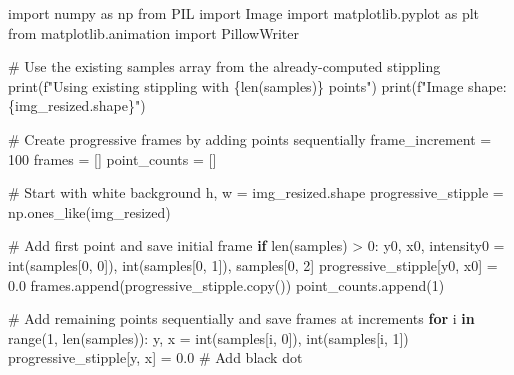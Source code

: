 \documentclass[
  letterpaper,
  DIV=11,
  numbers=noendperiod]{scrartcl}
\newenvironment{Shaded}{\begin{snugshade}}{\end{snugshade}}
\newcommand{\BuiltInTok}[1]{\textcolor[rgb]{0.00,0.23,0.31}{#1}}
\newcommand{\CommentTok}[1]{\textcolor[rgb]{0.37,0.37,0.37}{#1}}
\newcommand{\ControlFlowTok}[1]{\textcolor[rgb]{0.00,0.23,0.31}{\textbf{#1}}}
\newcommand{\DecValTok}[1]{\textcolor[rgb]{0.68,0.00,0.00}{#1}}
\newcommand{\FloatTok}[1]{\textcolor[rgb]{0.68,0.00,0.00}{#1}}
\newcommand{\ImportTok}[1]{\textcolor[rgb]{0.00,0.46,0.62}{#1}}
\newcommand{\KeywordTok}[1]{\textcolor[rgb]{0.00,0.23,0.31}{\textbf{#1}}}
\newcommand{\NormalTok}[1]{\textcolor[rgb]{0.00,0.23,0.31}{#1}}
\newcommand{\OperatorTok}[1]{\textcolor[rgb]{0.37,0.37,0.37}{#1}}
\newcommand{\SpecialCharTok}[1]{\textcolor[rgb]{0.37,0.37,0.37}{#1}}
\newcommand{\SpecialStringTok}[1]{\textcolor[rgb]{0.13,0.47,0.30}{#1}}
\begin{document}
\label{progressive-stippling}
\begin{Shaded}
\begin{Highlighting}[]
\ImportTok{import}\NormalTok{ numpy }\ImportTok{as}\NormalTok{ np}
\ImportTok{from}\NormalTok{ PIL }\ImportTok{import}\NormalTok{ Image}
\ImportTok{import}\NormalTok{ matplotlib.pyplot }\ImportTok{as}\NormalTok{ plt}
\ImportTok{from}\NormalTok{ matplotlib.animation }\ImportTok{import}\NormalTok{ PillowWriter}

\CommentTok{\# Use the existing samples array from the already{-}computed stippling}
\BuiltInTok{print}\NormalTok{(}\SpecialStringTok{f"Using existing stippling with }\SpecialCharTok{\{}\BuiltInTok{len}\NormalTok{(samples)}\SpecialCharTok{\}}\SpecialStringTok{ points"}\NormalTok{)}
\BuiltInTok{print}\NormalTok{(}\SpecialStringTok{f"Image shape: }\SpecialCharTok{\{}\NormalTok{img\_resized}\SpecialCharTok{.}\NormalTok{shape}\SpecialCharTok{\}}\SpecialStringTok{"}\NormalTok{)}

\CommentTok{\# Create progressive frames by adding points sequentially}
\NormalTok{frame\_increment }\OperatorTok{=} \DecValTok{100}
\NormalTok{frames }\OperatorTok{=}\NormalTok{ []}
\NormalTok{point\_counts }\OperatorTok{=}\NormalTok{ []}

\CommentTok{\# Start with white background}
\NormalTok{h, w }\OperatorTok{=}\NormalTok{ img\_resized.shape}
\NormalTok{progressive\_stipple }\OperatorTok{=}\NormalTok{ np.ones\_like(img\_resized)}

\CommentTok{\# Add first point and save initial frame}
\ControlFlowTok{if} \BuiltInTok{len}\NormalTok{(samples) }\OperatorTok{\textgreater{}} \DecValTok{0}\NormalTok{:}
\NormalTok{    y0, x0, intensity0 }\OperatorTok{=} \BuiltInTok{int}\NormalTok{(samples[}\DecValTok{0}\NormalTok{, }\DecValTok{0}\NormalTok{]), }\BuiltInTok{int}\NormalTok{(samples[}\DecValTok{0}\NormalTok{, }\DecValTok{1}\NormalTok{]), samples[}\DecValTok{0}\NormalTok{, }\DecValTok{2}\NormalTok{]}
\NormalTok{    progressive\_stipple[y0, x0] }\OperatorTok{=} \FloatTok{0.0}
\NormalTok{    frames.append(progressive\_stipple.copy())}
\NormalTok{    point\_counts.append(}\DecValTok{1}\NormalTok{)}

\CommentTok{\# Add remaining points sequentially and save frames at increments}
\ControlFlowTok{for}\NormalTok{ i }\KeywordTok{in} \BuiltInTok{range}\NormalTok{(}\DecValTok{1}\NormalTok{, }\BuiltInTok{len}\NormalTok{(samples)):}
\NormalTok{    y, x }\OperatorTok{=} \BuiltInTok{int}\NormalTok{(samples[i, }\DecValTok{0}\NormalTok{]), }\BuiltInTok{int}\NormalTok{(samples[i, }\DecValTok{1}\NormalTok{])}
\NormalTok{    progressive\_stipple[y, x] }\OperatorTok{=} \FloatTok{0.0}  \CommentTok{\# Add black dot}
    

\end{Highlighting}
\end{Shaded}
\end{document}
